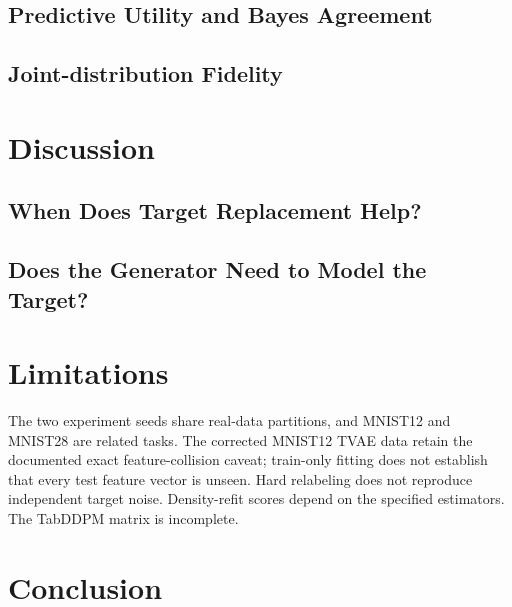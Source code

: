 \documentclass[letterpaper]{article}
\begin{document}
\subsection{Predictive Utility and Bayes Agreement}
\subsection{Joint-distribution Fidelity}

\section{Discussion}
\subsection{When Does Target Replacement Help?}
\subsection{Does the Generator Need to Model the Target?}

\section{Limitations}
The two experiment seeds share real-data partitions, and MNIST12 and
MNIST28 are related tasks. The corrected MNIST12 TVAE data retain the
documented exact feature-collision caveat; train-only fitting does not
establish that every test feature vector is unseen. Hard relabeling does
not reproduce independent target noise. Density-refit scores depend on
the specified estimators. The TabDDPM matrix is incomplete.

\section{Conclusion}

\end{document}
